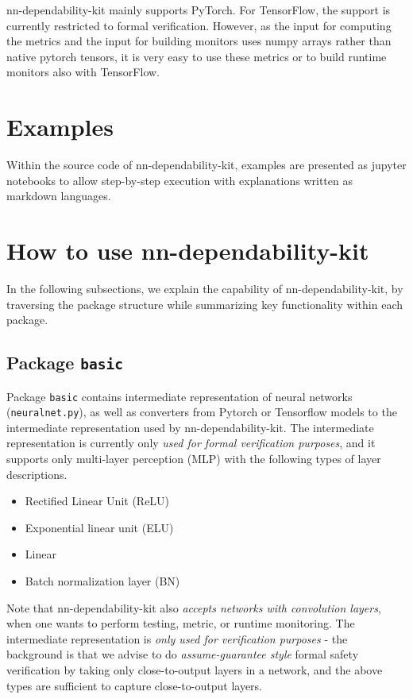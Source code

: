 \documentclass{article}
\begin{document}
\textsf{nn-dependability-kit} mainly supports PyTorch. For TensorFlow, the support is currently restricted to formal verification. However, as the input for computing the metrics and the input for building monitors uses numpy arrays rather than native pytorch tensors, it is very easy to use these metrics or to build runtime monitors also with TensorFlow. 


\section{Examples}

Within the source code of \textsf{nn-dependability-kit}, examples are presented as jupyter notebooks to allow step-by-step execution with explanations written as markdown languages.  

\section{How to use \textsf{nn-dependability-kit}}

In the following subsections, we explain the capability of \textsf{nn-dependability-kit}, by traversing the package structure while summarizing key functionality within each package. 

\subsection{Package \texttt{basic}} 

Package \texttt{basic} contains intermediate representation of neural networks (\texttt{neuralnet.py}), as well as converters from Pytorch or Tensorflow models to the intermediate representation used by \textsf{nn-dependability-kit}. The intermediate representation is currently only \emph{used for formal verification purposes}, and it supports only multi-layer perception (MLP) with the following types of layer descriptions. 

\begin{itemize}
    \item Rectified Linear Unit (ReLU)
    \item Exponential linear unit (ELU)
    \item Linear 
    \item Batch normalization layer (BN)
\end{itemize}

Note that \textsf{nn-dependability-kit} also \emph{accepts networks with convolution layers}, when one wants to perform testing, metric, or runtime monitoring. The intermediate representation is \emph{only used for verification purposes} - the background is that we advise to do \emph{assume-guarantee style} formal safety verification by taking only close-to-output layers in a network, and the above types are sufficient to capture close-to-output layers.
\end{document}

